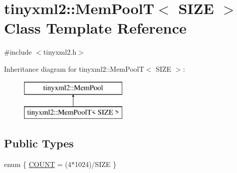 \hypertarget{classtinyxml2_1_1_mem_pool_t}{}\section{tinyxml2\+:\+:Mem\+Pool\+T$<$ S\+I\+Z\+E $>$ Class Template Reference}
\label{classtinyxml2_1_1_mem_pool_t}


{\ttfamily \#include $<$tinyxml2.\+h$>$}

Inheritance diagram for tinyxml2\+:\+:Mem\+Pool\+T$<$ S\+I\+Z\+E $>$\+:\begin{figure}[H]
\begin{center}
\leavevmode
\includegraphics[height=2.000000cm]{classtinyxml2_1_1_mem_pool_t}
\end{center}
\end{figure}
\subsection*{Public Types}
\begin{DoxyCompactItemize}
\item 
enum \{ \hyperlink{classtinyxml2_1_1_mem_pool_t_a04cf45156e6f913f93972869ff8a1d94a4eeedbaa09fc9968120af6190e9e0988}{C\+O\+U\+N\+T} = (4$\ast$1024)/\+S\+I\+Z\+E
 \}
\end{DoxyCompactItemize}
